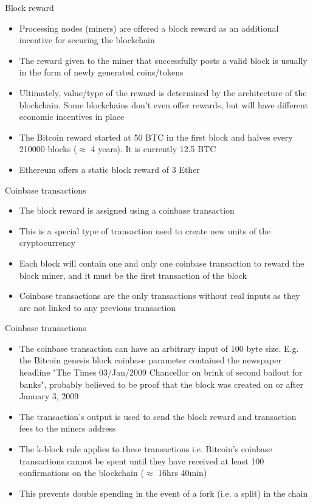 \documentclass[11pt]{beamer}
\begin{document}
\begin{frame}{Block reward}
	\begin{itemize}
		\item Processing nodes (miners) are offered a block reward as an additional incentive for securing the blockchain
		\item The reward given to the miner that successfully posts a valid block is usually in the form of newly generated coins/tokens
		\item Ultimately, value/type of the reward is determined by the architecture of the blockchain. Some blockchains don't even offer rewards, but will have different economic incentives in place
		\item The Bitcoin reward started at 50 BTC in the first block and halves every 210000 blocks ($\approx$ 4 years). It is currently 12.5 BTC
		\item Ethereum offers a static block reward of 3 Ether
	\end{itemize}
\end{frame}



\begin{frame}{Coinbase transactions}
	\begin{itemize}
		\item The block reward is assigned using a coinbase transaction
		\item This is a special type of transaction used to create new units of the cryptocurrency
		\item Each block will contain one and only one coinbase transaction to reward the block miner, and it must be the first transaction of the block
		\item Coinbase transactions are the only transactions without real inputs as they are not linked to any previous transaction
	\end{itemize}
\end{frame}


\begin{frame}{Coinbase transactions}
	\begin{itemize}
		\item The coinbase transaction can have an arbitrary input of 100 byte size. E.g. the Bitcoin genesis block coinbase parameter contained the newspaper  headline "The Times 03/Jan/2009 Chancellor on brink of second bailout for banks", probably believed to be proof that the block was created on or after January 3, 2009
		\item The transaction's output is used to send the block reward and transaction fees to the miners address
		\item The k-block rule applies to these transactions i.e. Bitcoin's coinbase transactions cannot be spent until they have received at least 100 confirmations on the blockchain ($\approx$ 16hrs 40min)
		\item This prevents double spending in the event of a fork (i.e. a split) in the chain
	\end{itemize}
\end{frame}
\end{document}
